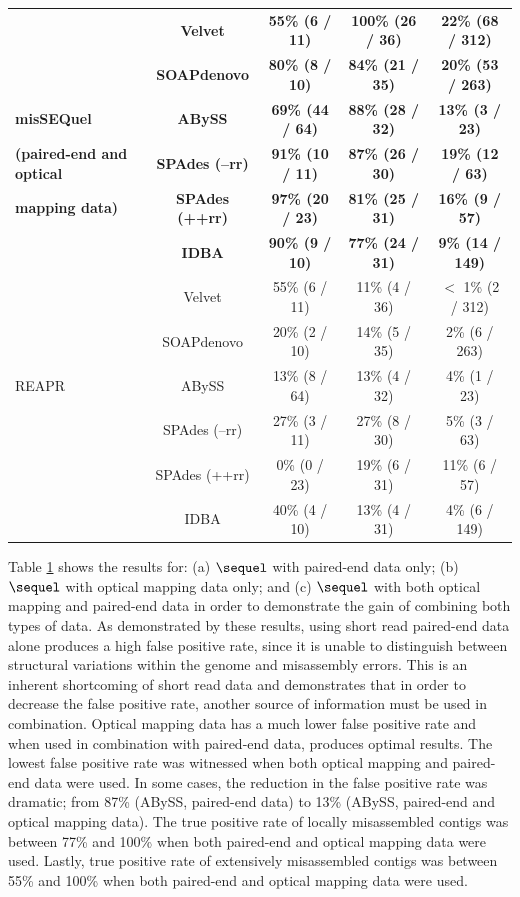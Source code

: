 \documentclass[doctor]{thesis}
\begin{document}
\begin{table}[h!]
\begin{center}
{\begin{tabular}{|l|c|c|c|c|}
							& {\bf Velvet}					& {\bf 55\% (6 / 11)}			& {\bf 100\% (26 / 36)}		&	{\bf 22\% (68 / 312)}	\\ 
							& {\bf  SOAPdenovo}				& {\bf 80\% (8 / 10)}			&{\bf 84\% (21 / 35)}			&	{\bf 20\% (53 / 263)}	\\
 {\sc\bf misSEQuel}				& {\bf ABySS}					& {\bf 69\% (44 / 64)}			& {\bf 88\% (28 / 32)}			&	{\bf 13\% (3 / 23)}		\\ 
{\bf (paired-end and optical}	& {\bf  SPAdes (--rr)}				&{\bf 91\% (10 / 11)}			& {\bf 87\% (26 / 30)}			&	{\bf 19\% (12 / 63)}		\\ 
{\bf mapping data)}				& {\bf SPAdes (++rr)}				&{\bf 97\% (20 / 23)}			& {\bf 81\% (25 / 31)}			&	{\bf 16\% (9 / 57)}		\\ 
							& {\bf IDBA}					&{\bf 90\% (9 / 10)}			&{\bf  77\% (24 / 31)}			&	{\bf 9\% (14 / 149)}		\\ 
\hline \hline
							& Velvet						& 55\% (6 / 11)		& 11\% (4 / 36)				& $<$ 1\% (2 / 312)		\\ 
							& SOAPdenovo				& 20\% (2 / 10)		& 14\% (5 / 35)				& 2\% (6 / 263)	\\  
REAPR						& ABySS						& 13\% (8 / 64)		& 13\% (4 / 32)				& 4\% (1 / 23)			\\  
							& SPAdes (--rr)					& 27\% (3 / 11)		& 27\% (8 / 30)				& 5\% (3 / 63)			\\ 
							& SPAdes (++rr)				& 0\% (0 / 23)		& 19\% (6 / 31)				& 11\% (6 / 57)		\\
							& IDBA						& 40\% (4 / 10)		& 13\% (4 / 31)				& 4\% (6 / 149)			\\ 
\hline
\end{tabular}}
\label{tab:roc}
\end{center}
\end{table}



Table \ref{tab:roc} shows the results for: (a) $\sequel$ with paired-end data only; (b) $\sequel$ with optical mapping data only; and (c) $\sequel$ with both optical mapping and paired-end data in order to demonstrate the gain of combining both types of data.  
As demonstrated by these results, using short read paired-end data alone produces a high false positive rate, since it is unable to distinguish between structural variations within the genome and misassembly errors.  
This is an inherent shortcoming of short read data and demonstrates that in order to decrease the false positive rate, another source of information must be used in combination.
Optical mapping data has a much lower false positive rate and when used in combination with paired-end data, produces optimal results.  The lowest false positive rate was witnessed when both optical mapping and paired-end data were used.  In some cases, the reduction in the false positive rate was dramatic; from 87\% (ABySS, paired-end data) to 13\% (ABySS, paired-end and optical mapping data).  The true positive rate of locally misassembled contigs was between 77\% and 100\% when both paired-end and optical mapping data were used.  Lastly, true positive rate of extensively misassembled contigs was between 55\% and 100\% when both paired-end and optical mapping data were used. 
\end{document}
